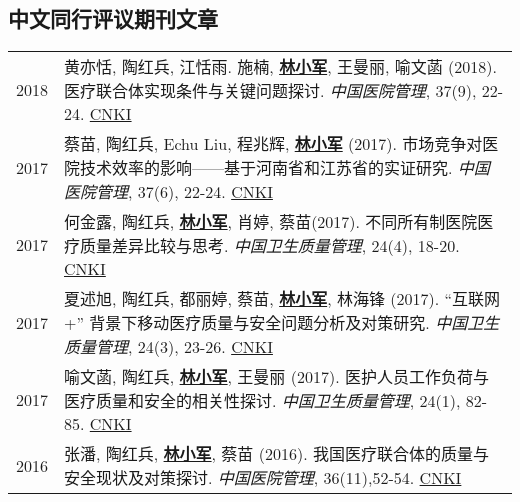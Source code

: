 \documentclass{resume}
\begin{document}
\subsection*{\textbf{中文同行评议期刊文章}}
\begin{longtable}{r p{14cm}}

2018 & 黄亦恬, 陶红兵, 江恬雨. 施楠, \underline{\textbf{林小军}}, 王曼丽, 喻文菡 (2018). 医疗联合体实现条件与关键问题探讨. \emph{ 中国医院管理}, 37(9), 22-24. \href{http://kns.cnki.net/KCMS/detail/detail.aspx?dbcode=CJFQ&dbname=CJFDLAST2018&filename=YYGL201809005&v=MjIxMjdlWnVadEZpRGxWNzNPUERUTVlyRzRIOW5NcG85RllZUjhlWDFMdXhZUzdEaDFUM3FUcldNMUZyQ1VSTEs=}{CNKI} \\
2017 & 蔡苗, 陶红兵, Echu Liu, 程兆辉, \underline{\textbf{林小军}} (2017). 市场竞争对医院技术效率的影响——基于河南省和江苏省的实证研究. \emph{ 中国医院管理}, 37(6), 22-24. \href{http://kns.cnki.net/KCMS/detail/detail.aspx?dbcode=CJFQ&dbname=CJFDLAST2017&filename=YYGL201706012&v=MzEzMTREbFZMdkFQRFRNWXJHNEg5Yk1xWTlFWm9SOGVYMUx1eFlTN0RoMVQzcVRyV00xRnJDVVJMS2VadVp0Rmk=}{CNKI}\\
2017 & 何金露, 陶红兵, \underline{\textbf{林小军}}, 肖婷, 蔡苗(2017). 不同所有制医院医疗质量差异比较与思考. \emph{ 中国卫生质量管理}, 24(4), 18-20. \href{http://kns.cnki.net/KCMS/detail/detail.aspx?dbcode=CJFQ&dbname=CJFDLAST2017&filename=WSJG201704010&v=MTU5NzM0OUVaSVI4ZVgxTHV4WVM3RGgxVDNxVHJXTTFGckNVUkxLZVp1WnRGaURtVTcvTU1qN0JhYkc0SDliTXE=}{CNKI}\\
2017 & 夏述旭, 陶红兵, 都丽婷, 蔡苗, \underline{\textbf{林小军}}, 林海锋 (2017). “互联网+” 背景下移动医疗质量与安全问题分析及对策研究. \emph{ 中国卫生质量管理}, 24(3), 23-26. \href{http://kns.cnki.net/KCMS/detail/detail.aspx?dbcode=CJFQ&dbname=CJFDLAST2017&filename=WSJG201703030&v=MjQwMTVHWklSOGVYMUx1eFlTN0RoMVQzcVRyV00xRnJDVVJMS2VadVp0RmlEbVViL01NajdCYWJHNEg5Yk1ySTk=}{CNKI}\\
2017 & 喻文菡, 陶红兵, \underline{\textbf{林小军}}, 王曼丽 (2017). 医护人员工作负荷与医疗质量和安全的相关性探讨. \emph{ 中国卫生质量管理}, 24(1), 82-85. \href{http://kns.cnki.net/KCMS/detail/detail.aspx?dbcode=CJFQ&dbname=CJFDLAST2017&filename=WSJG201701013&v=MDI5NThSOGVYMUx1eFlTN0RoMVQzcVRyV00xRnJDVVJMS2VadVp0RmlEbVY3M09NajdCYWJHNEg5Yk1ybzlFWjQ=}{CNKI}\\
2016 & 张潘, 陶红兵,  \underline{\textbf{林小军}}, 蔡苗 (2016). 我国医疗联合体的质量与安全现状及对策探讨. \emph{ 中国医院管理}, 36(11),52-54. \href{http://kns.cnki.net/KCMS/detail/detail.aspx?dbcode=CJFQ&dbname=CJFDLAST2016&filename=YYGL201611027&v=MjM5Mjl1WnNGaXZtVTcvS1BEVE1Zckc0SDlmTnJvOUhZNFI4ZVgxTHV4WVM3RGgxVDNxVHJXTTFGckNVUkxLZVo=}{CNKI}\\

\end{longtable}
\end{document}

